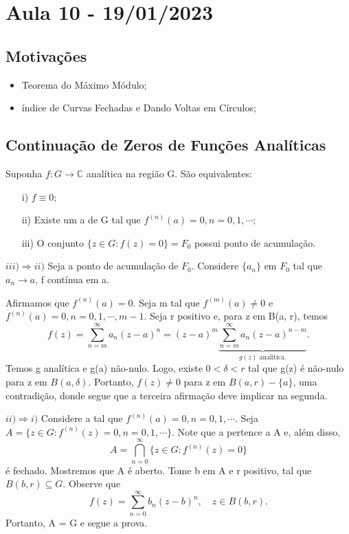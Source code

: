 \documentclass[complex.tex]{subfiles}
\begin{document}
\section{Aula 10 - 19/01/2023}
\subsection{Motivações}
\begin{itemize}
	\item Teorema do Máximo Módulo;
	\item índice de Curvas Fechadas e Dando Voltas em Círculos;
\end{itemize}

\subsection{Continuação de Zeros de Funções Analíticas}
\begin{prop*}
	Suponha $f:G\rightarrow \mathbb{C}$ analítica na região G. São equivalentes:
	\begin{itemize}
		\item[i)] $f\equiv0$;
		\item[ii)] Existe um a de G tal que $f^{(n)}(a) = 0, n = 0, 1, \cdots;$
		\item[iii)] O conjunto $\{z\in{G}: f(z) = 0\} = F_{0} $ possui ponto de acumulação.
	\end{itemize}
\end{prop*}
\begin{proof*}
	$iii)\Rightarrow ii)$ Seja a ponto de acumulação de $F_{0}$. Considere $\{a_{n}\} $ em $F_{0}$ tal que $a_{n}\to{a}$, f contínua em a.

	Afirmamos que $f^{(n)}(a) = 0.$  Seja m tal que $f^{(m)}(a)\neq 0 $ e $f^{(n)}(a) = 0, n = 0, 1, \cdots, m-1 $. Seja r positivo
	e, para z em B(a, r), temos
	$$
		f(z) = \sum\limits_{n=m}^{\infty}a_{n}(z-a)^{n} = (z-a)^{m}\underbrace{\sum\limits_{n=m}^{\infty}a_{n}(z-a)^{n-m}}_{g(z)\text{ analítica.}}.
	$$
	Temos g analítica e g(a) não-nulo. Logo, existe $0 < \delta < r$ tal que g(z) é não-nulo para z em $B(a, \delta)$. Portanto,
	$f(z)\neq0$ para z em $B(a, r) - \{a\} $, uma contradição, donde segue que a terceira afirmação deve implicar na segunda. \qedsymbol

	$ii)\Rightarrow i)$ Considere a tal que $f^{(n)}(a) = 0, n = 0, 1, \cdots$. Seja $A=\{z\in{G}: f^{(n)}(z) = 0, n=0, 1, \cdots\} $. Note que
	a pertence a A e, além disso,
	$$
		A = \bigcap_{n=0}^{\infty}\{z\in{G}: f^{(n)}(z) = 0\}
	$$
	é fechado. Mostremos que A é aberto. Tome b em A e r positivo, tal que $B(b, r)\subseteq{G}.$ Observe que
	$$
		f(z) = \sum\limits_{n=0}^{\infty}b_{n}(z-b)^{n}, \quad z\in{B(b, r)}.
	$$
	Portanto, A = G e segue a prova. \qedsymbol
\end{proof*}
\end{document}
